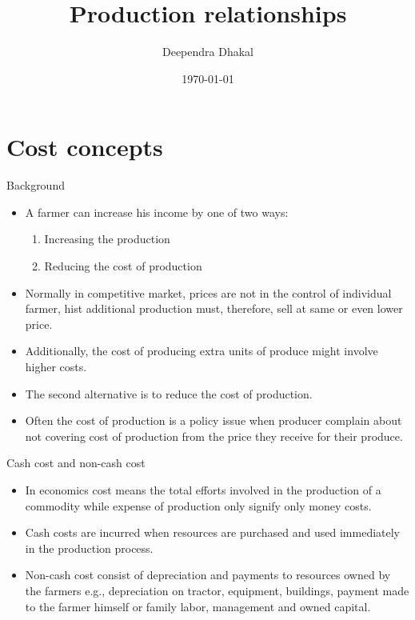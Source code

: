 \documentclass[12pt,ignorenonframetext,aspectratio=169]{beamer}
\title{\insertsectionhead}
  {
    \definecolor{white}{rgb}{0.776,0.357,0.157}
    \definecolor{iqss@orange}{rgb}{1,1,1}
    \ifnum \insertmainframenumber > \insertframenumber
    \frame{
      \frametitle{\iqsssectiontitleheader}
      \tableofcontents[currentsection]
    }
    \else
    \frame{
      \frametitle{Backup Slides}
      \tableofcontents[sectionstyle=shaded/shaded,subsectionstyle=shaded/shaded/shaded]
    }
    \fi
  }
\title[]{Production relationships}
\author[
        Deependra Dhakal
    ]{Deependra Dhakal}
\institute[
    ]{
    GAASC, Baitadi \and Tribhuwan University
    }
\date[
      \today
  ]{
      \today
        }
\providecommand{\tightlist}{%
  \setlength{\itemsep}{0pt}\setlength{\parskip}{0pt}}
\begin{document}
  \begin{frame}[plain]
  \titlepage
  \end{frame}



\hypertarget{cost-concepts}{%
\section{Cost concepts}\label{cost-concepts}}

\begin{frame}{Background}
\protect\hypertarget{background}{}
\begin{itemize}
\tightlist
\item
  A farmer can increase his income by one of two ways:

  \begin{enumerate}
  \tightlist
  \item
    Increasing the production
  \item
    Reducing the cost of production
  \end{enumerate}
\item
  Normally in competitive market, prices are not in the control of
  individual farmer, hist additional production must, therefore, sell at
  same or even lower price.
\item
  Additionally, the cost of producing extra units of produce might
  involve higher costs.
\item
  The second alternative is to reduce the cost of production.
\item
  Often the cost of production is a policy issue when producer complain
  about not covering cost of production from the price they receive for
  their produce.
\end{itemize}
\end{frame}

\begin{frame}{Cash cost and non-cash cost}
\protect\hypertarget{cash-cost-and-non-cash-cost}{}
\begin{itemize}
\tightlist
\item
  In economics cost means the total efforts involved in the production
  of a commodity while expense of production only signify only money
  costs.
\item
  Cash costs are incurred when resources are purchased and used
  immediately in the production process.
\item
  Non-cash cost consist of depreciation and payments to resources owned
  by the farmers e.g., depreciation on tractor, equipment, buildings,
  payment made to the farmer himself or family labor, management and
  owned capital.
\end{itemize}
\end{frame}
\end{document}

